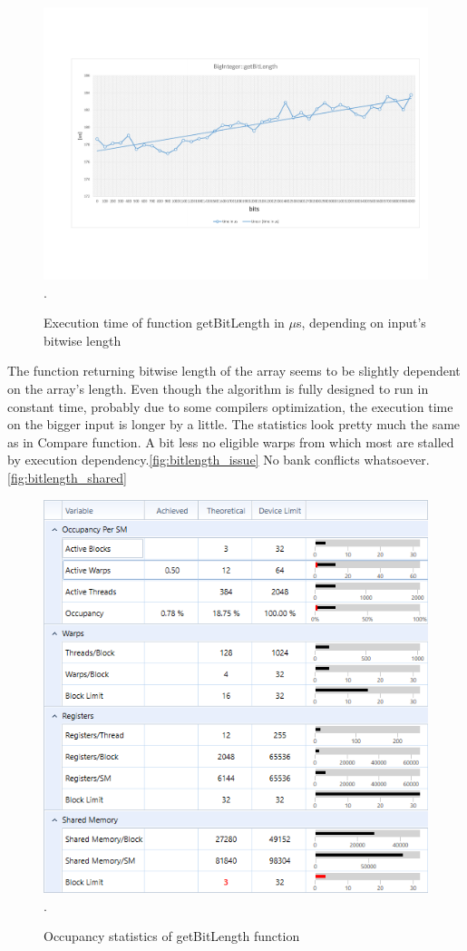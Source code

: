 \documentclass[oneside,openright,12pt,final,en]{mgr}
\begin{document}
\begin{figure}[H]
	\centering
	\includegraphics[width=\textwidth,trim={0.5cm 2.8cm 0.4cm 2.8cm},clip]{bitlength.pdf}.
	\caption{Execution time of function getBitLength in $\mu$s, depending on input's bitwise length}
	\label{fig:bitlength}
\end{figure}

The function returning bitwise length of the array seems to be slightly dependent on the array's length. Even though the algorithm is fully designed to run in constant time, probably due to some compilers optimization, the execution time on the bigger input is longer by a little. The statistics look pretty much the same as in Compare function. A bit less no eligible warps from which most are stalled by execution dependency.\ref{fig:bitlength_issue} No bank conflicts whatsoever.\ref{fig:bitlength_shared}

\begin{figure}[H]
	\centering
	\includegraphics[width=\textwidth]{bitlength_occupancy}.
	\caption{Occupancy statistics of getBitLength function}
	\label{fig:bitlength_occupancy}
\end{figure}
\end{document}
